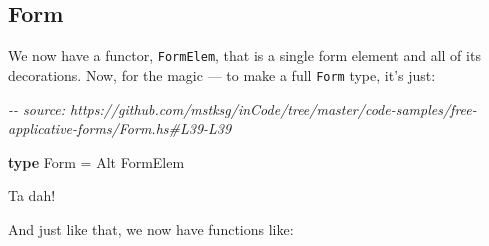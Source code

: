 \documentclass[]{article}
\newenvironment{Shaded}{}{}
\newcommand{\CommentTok}[1]{\textcolor[rgb]{0.38,0.63,0.69}{\textit{#1}}}
\newcommand{\DataTypeTok}[1]{\textcolor[rgb]{0.56,0.13,0.00}{#1}}
\newcommand{\KeywordTok}[1]{\textcolor[rgb]{0.00,0.44,0.13}{\textbf{#1}}}
\newcommand{\OtherTok}[1]{\textcolor[rgb]{0.00,0.44,0.13}{#1}}
\begin{document}
\hypertarget{form}{%
\subsection{Form}\label{form}}

We now have a functor, \texttt{FormElem}, that is a single form element and all
of its decorations. Now, for the magic --- to make a full \texttt{Form} type,
it's just:

\begin{Shaded}
\begin{Highlighting}[]
\CommentTok{{-}{-} source: https://github.com/mstksg/inCode/tree/master/code{-}samples/free{-}applicative{-}forms/Form.hs\#L39{-}L39}

\KeywordTok{type} \DataTypeTok{Form} \OtherTok{=} \DataTypeTok{Alt} \DataTypeTok{FormElem}
\end{Highlighting}
\end{Shaded}

Ta dah!

And just like that, we now have functions like:
\end{document}
